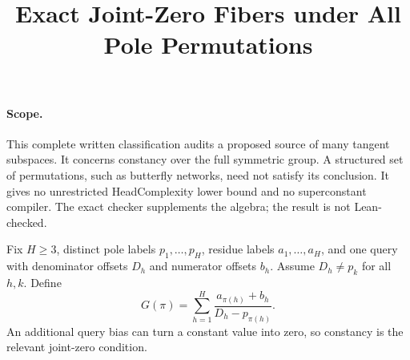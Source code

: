 \documentclass[11pt]{article}
\title{Exact Joint-Zero Fibers under All Pole Permutations}
\author{}
\date{}
\begin{document}
\maketitle

\paragraph{Scope.}
This complete written classification audits a proposed source of
many tangent subspaces. It concerns constancy over the full symmetric
group. A structured set of permutations, such as butterfly networks,
need not satisfy its conclusion. It gives no unrestricted
HeadComplexity lower bound and no superconstant compiler. The exact
checker supplements the algebra; the result is not Lean-checked.

Fix $H\geq3$, distinct pole labels $p_1,\ldots,p_H$, residue labels
$a_1,\ldots,a_H$, and one query with denominator offsets $D_h$ and
numerator offsets $b_h$. Assume $D_h\ne p_k$ for all $h,k$. Define
\[
 G(\pi)=\sum_{h=1}^H\frac{a_{\pi(h)}+b_h}{D_h-p_{\pi(h)}}.
 \tag{1}
\]
An additional query bias can turn a constant value into zero, so
constancy is the relevant joint-zero condition.
\end{document}
